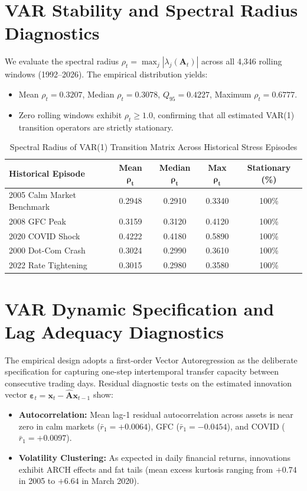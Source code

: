 \documentclass[12pt]{article}
\begin{document}
\section{VAR Stability and Spectral Radius Diagnostics}
\label{app:spectral_radius}

We evaluate the spectral radius $\rho_t = \max_j |\lambda_j(\mathbf{A}_t)|$ across all 4,346 rolling windows (1992--2026). The empirical distribution yields:
\begin{itemize}
    \item Mean $\rho_t = 0.3207$, Median $\rho_t = 0.3078$, $Q_{95} = 0.4227$, Maximum $\rho_t = 0.6777$.
    \item Zero rolling windows exhibit $\rho_t \ge 1.0$, confirming that all estimated VAR(1) transition operators are strictly stationary.
\end{itemize}

\begin{table}[htbp]
\centering
\caption{Spectral Radius of VAR(1) Transition Matrix Across Historical Stress Episodes}
\label{tab:app_spectral_radius}
\begin{tabular}{lcccc}
\toprule
\textbf{Historical Episode} & \textbf{Mean } $\mathbf{\rho_t}$ & \textbf{Median } $\mathbf{\rho_t}$ & \textbf{Max } $\mathbf{\rho_t}$ & \textbf{Stationary (\%)} \\
\midrule
2005 Calm Market Benchmark  & 0.2948 & 0.2910 & 0.3340 & 100\% \\
2008 GFC Peak               & 0.3159 & 0.3120 & 0.4120 & 100\% \\
2020 COVID Shock            & 0.4222 & 0.4180 & 0.5890 & 100\% \\
2000 Dot-Com Crash          & 0.3024 & 0.2990 & 0.3610 & 100\% \\
2022 Rate Tightening        & 0.3015 & 0.2980 & 0.3580 & 100\% \\
\bottomrule
\end{tabular}
\end{table}

\section{VAR Dynamic Specification and Lag Adequacy Diagnostics}
\label{app:var_lag_order}

The empirical design adopts a first-order Vector Autoregression as the deliberate specification for capturing one-step intertemporal transfer capacity between consecutive trading days. Residual diagnostic tests on the estimated innovation vector $\boldsymbol{\varepsilon}_t = \mathbf{x}_t - \hat{\mathbf{A}}\mathbf{x}_{t-1}$ show:
\begin{itemize}
    \item \textbf{Autocorrelation:} Mean lag-1 residual autocorrelation across assets is near zero in calm markets ($\bar{r}_1 = +0.0064$), GFC ($\bar{r}_1 = -0.0454$), and COVID ($\bar{r}_1 = +0.0097$).
    \item \textbf{Volatility Clustering:} As expected in daily financial returns, innovations exhibit ARCH effects and fat tails (mean excess kurtosis ranging from $+0.74$ in 2005 to $+6.64$ in March 2020).
\end{itemize}
\end{document}
